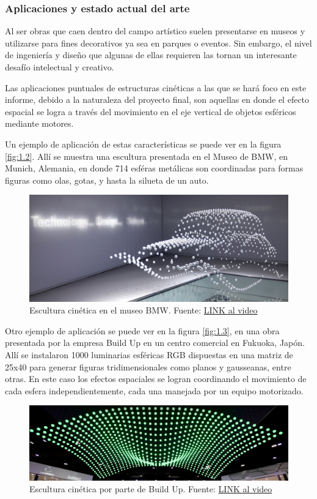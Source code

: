 \subsubsection{Aplicaciones y estado actual del arte}
Al ser obras que caen dentro del campo artístico suelen presentarse en museos y utilizarse para fines decorativos ya sea en parques o eventos. Sin embargo, el nivel de ingeniería y diseño que algunas de ellas requieren las tornan un interesante desafío intelectual y creativo.

Las aplicaciones puntuales de estructuras cinéticas a las que se hará foco en este informe, debido a la naturaleza del proyecto final, son aquellas en donde el efecto espacial se logra a través del movimiento en el eje vertical de objetos esféricos mediante motores. 

Un ejemplo de aplicación de estas características se puede ver en la figura \ref{fig:1.2}. Allí se muestra una escultura presentada en el Museo de BMW, en Munich, Alemania, en donde 714 esféras metálicas son coordinadas para formas figuras como olas, gotas, y hasta la silueta de un auto.

\begin{figure}[!ht]
	\centering
	\includegraphics[width=15cm,scale=1]{resources/1_2-kinSculp.png}
	\caption{ Escultura cinética en el museo BMW. Fuente: \href{https://www.youtube.com/watch?v=HVhVClFMg6Y}{LINK al video} }
	\label{fig:\thefigure}
\end{figure}

Otro ejemplo de aplicación se puede ver en la figura \ref{fig:1.3}, en una obra presentada por la empresa Build Up en un centro comercial en Fukuoka, Japón. Allí se instalaron 1000 luminarias esféricas RGB dispuestas en una matriz de 25x40 para generar figuras tridimensionales como planos y gausseanas, entre otras. En este caso los efectos espaciales se logran coordinando el movimiento de cada esfera independientemente, cada una manejada por un equipo motorizado.
\begin{figure}[!ht]
	\centering
	\includegraphics[width=15cm,scale=1]{resources/1_3-kinSculp.png}
	\caption{ Escultura cinética por parte de Build Up. Fuente: \href{https://www.youtube.com/watch?v=ICixCazf6-k}{LINK al video} }
	\label{fig:\thefigure}
\end{figure}

